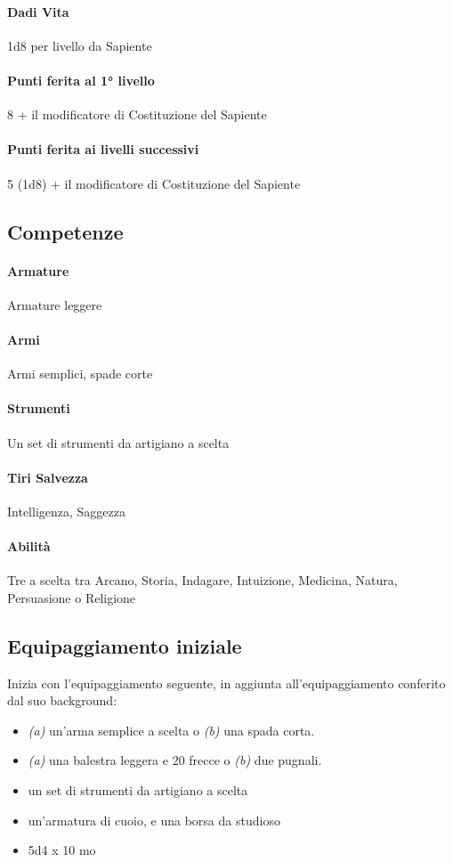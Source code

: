 \paragraph{Dadi Vita} 1d8 per livello da Sapiente
\paragraph{Punti ferita al 1° livello} 8 + il modificatore di Costituzione del Sapiente
\paragraph{Punti ferita ai livelli successivi} 5 (1d8) + il modificatore di Costituzione del Sapiente

\subsection{Competenze}
\paragraph{Armature} Armature leggere
\paragraph{Armi} Armi semplici, spade corte
\paragraph{Strumenti} Un set di strumenti da artigiano a scelta
\paragraph{Tiri Salvezza} Intelligenza, Saggezza
\paragraph{Abilità} Tre a scelta tra Arcano, Storia, Indagare, Intuizione,  Medicina, Natura, Persuasione o Religione

\subsection{Equipaggiamento iniziale}
Inizia con l'equipaggiamento seguente, in aggiunta all'equipaggiamento conferito dal suo background:
\begin{itemize}
    \item {\it(a)} un'arma semplice a scelta o {\it(b)} una spada corta.
    \item {\it(a)} una balestra leggera e 20 frecce o {\it(b)} due pugnali.
    \item un set di strumenti da artigiano a scelta
    \item un'armatura di cuoio, e una borsa da studioso
    \item 5d4 x 10 mo
\end{itemize}

